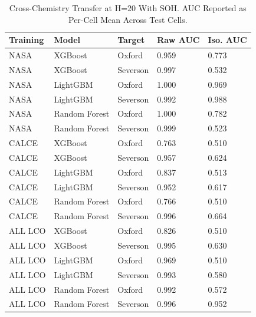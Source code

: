 \documentclass[journal]{IEEEtran}
\begin{document}
\begin{table}[t]
\caption{Cross-Chemistry Transfer at H=20 With SOH. AUC Reported as Per-Cell Mean Across Test Cells.}
\label{tab:crosswith}
\centering
\begin{tabular}{lllll}
\toprule
\textbf{Training} & \textbf{Model} & \textbf{Target} & \textbf{Raw AUC} & \textbf{Iso. AUC}\\
\midrule
NASA & XGBoost & Oxford & 0.959 & 0.773\\
NASA & XGBoost & Severson & 0.997 & 0.532\\
NASA & LightGBM & Oxford & 1.000 & 0.969\\
NASA & LightGBM & Severson & 0.992 & 0.988\\
NASA & Random Forest & Oxford & 1.000 & 0.782\\
NASA & Random Forest & Severson & 0.999 & 0.523\\
CALCE & XGBoost & Oxford & 0.763 & 0.510\\
CALCE & XGBoost & Severson & 0.957 & 0.624\\
CALCE & LightGBM & Oxford & 0.837 & 0.513\\
CALCE & LightGBM & Severson & 0.952 & 0.617\\
CALCE & Random Forest & Oxford & 0.766 & 0.510\\
CALCE & Random Forest & Severson & 0.996 & 0.664\\
ALL LCO & XGBoost & Oxford & 0.826 & 0.510\\
ALL LCO & XGBoost & Severson & 0.995 & 0.630\\
ALL LCO & LightGBM & Oxford & 0.969 & 0.510\\
ALL LCO & LightGBM & Severson & 0.993 & 0.580\\
ALL LCO & Random Forest & Oxford & 0.992 & 0.572\\
ALL LCO & Random Forest & Severson & 0.996 & 0.952\\
\bottomrule
\end{tabular}
\end{table}
\end{document}
